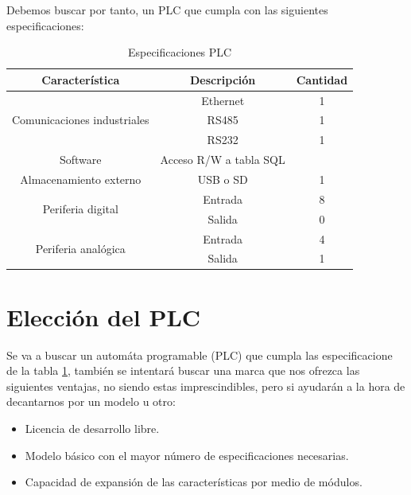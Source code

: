 Debemos buscar por tanto, un PLC que cumpla con las siguientes especificaciones:

\begin{table}[H]
\centering
\begin{tabular}{|c|c|c|}
\hline
\textbf{Característica }                              & \textbf{Descripción}            & \textbf{Cantidad} \\ \hline
\multirow{3}{*}{Comunicaciones industriales} & Ethernet               & 1        \\ \cline{2-3} 
                                             & RS485                  & 1        \\ \cline{2-3} 
                                             & RS232                  & 1        \\ \hline
Software                                     & Acceso R/W a tabla SQL &          \\ \hline
Almacenamiento externo                       & USB o SD               & 1        \\ \hline
\multirow{2}{*}{Periferia digital}           & Entrada                & 8        \\ \cline{2-3} 
                                             & Salida                 & 0        \\ \hline
\multirow{2}{*}{Periferia analógica}         & Entrada                & 4        \\ \cline{2-3} 
                                             & Salida                 & 1        \\ \hline
\end{tabular}
\caption{Especificaciones PLC}
\label{tab:espc_plc}
\end{table}

\section{Elección del PLC}
\label{eleccion_PLC}

Se va a buscar un automáta programable (PLC) que cumpla las especificacione de la tabla \ref{tab:espc_plc}, también se intentará buscar una marca que nos ofrezca las siguientes ventajas, no siendo estas imprescindibles, pero si ayudarán a la hora de decantarnos por un modelo u otro:

\begin{itemize}
		\item{Licencia de desarrollo libre.}
		\item{Modelo básico con el mayor número de especificaciones necesarias.}
		\item{Capacidad de expansión de las características por medio de módulos.}
\end{itemize}

